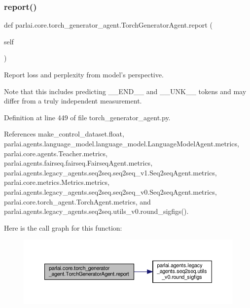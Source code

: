\subsubsection{\texorpdfstring{report()}{report()}}
{\footnotesize\ttfamily def parlai.\+core.\+torch\+\_\+generator\+\_\+agent.\+Torch\+Generator\+Agent.\+report (\begin{DoxyParamCaption}\item[{}]{self }\end{DoxyParamCaption})}

\begin{DoxyVerb}Report loss and perplexity from model's perspective.

Note that this includes predicting __END__ and __UNK__ tokens and may
differ from a truly independent measurement.
\end{DoxyVerb}
 

Definition at line 449 of file torch\+\_\+generator\+\_\+agent.\+py.



References make\+\_\+control\+\_\+dataset.\+float, parlai.\+agents.\+language\+\_\+model.\+language\+\_\+model.\+Language\+Model\+Agent.\+metrics, parlai.\+core.\+agents.\+Teacher.\+metrics, parlai.\+agents.\+fairseq.\+fairseq.\+Fairseq\+Agent.\+metrics, parlai.\+agents.\+legacy\+\_\+agents.\+seq2seq.\+seq2seq\+\_\+v1.\+Seq2seq\+Agent.\+metrics, parlai.\+core.\+metrics.\+Metrics.\+metrics, parlai.\+agents.\+legacy\+\_\+agents.\+seq2seq.\+seq2seq\+\_\+v0.\+Seq2seq\+Agent.\+metrics, parlai.\+core.\+torch\+\_\+agent.\+Torch\+Agent.\+metrics, and parlai.\+agents.\+legacy\+\_\+agents.\+seq2seq.\+utils\+\_\+v0.\+round\+\_\+sigfigs().

Here is the call graph for this function\+:
\nopagebreak
\begin{figure}[H]
\begin{center}
\leavevmode
\includegraphics[width=350pt]{classparlai_1_1core_1_1torch__generator__agent_1_1TorchGeneratorAgent_a3ed32722f939a8afd258830b7093fc18_cgraph}
\end{center}
\end{figure}
\mbox{\label{classparlai_1_1core_1_1torch__generator__agent_1_1TorchGeneratorAgent_a7cac9c087d7357d32a7c3bc8fa74930c}} 
